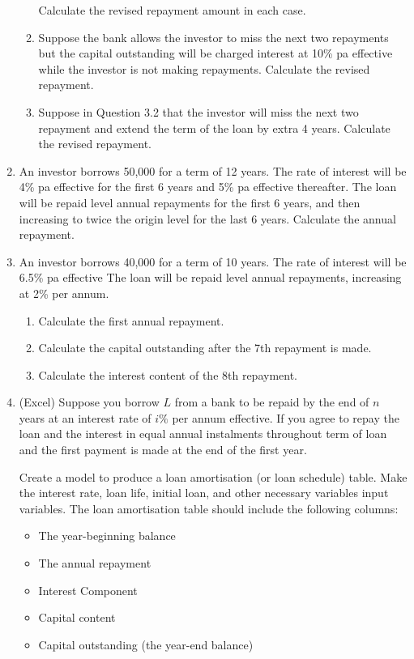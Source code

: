 \documentclass[
]{book}
\theoremstyle{definition}
\theoremstyle{definition}
\theoremstyle{definition}
\theoremstyle{definition}
\theoremstyle{remark}
\begin{document}
\begin{enumerate}
\begin{enumerate}
    Calculate the revised repayment amount in each case.
  \item
    Suppose the bank allows the
    investor to miss the next two repayments but the capital
    outstanding will be charged interest at 10\% pa effective while
    the investor is not making repayments. Calculate the revised
    repayment.
  \item
    Suppose in Question 3.2 that the investor will miss the next two
    repayment and extend the term of the loan by extra 4 years.
    Calculate the revised repayment.
  \end{enumerate}
\item
  An investor borrows 50,000 for a term of 12 years. The rate of
  interest will be 4\% pa effective for the first 6 years and 5\% pa
  effective thereafter. The loan will be repaid level annual
  repayments for the first 6 years, and then increasing to twice the
  origin level for the last 6 years. Calculate the annual repayment.
\item
  An investor borrows 40,000 for a term of 10 years. The rate of
  interest will be 6.5\% pa effective The loan will be repaid level
  annual repayments, increasing at 2\% per annum.

  \begin{enumerate}
  \def\labelenumii{\arabic{enumii}.}
  \item
    Calculate the first annual repayment.
  \item
    Calculate the capital outstanding after the 7th repayment is
    made.
  \item
    Calculate the interest content of the 8th repayment.
  \end{enumerate}
\item
  (Excel) Suppose you borrow \(L\) from a bank to be repaid by the end
  of \(n\) years at an interest rate of \(i\%\) per annum effective. If
  you agree to repay the loan and the interest in equal annual
  instalments throughout term of loan and the first payment is made at
  the end of the first year.

  Create a model to produce a loan amortisation (or loan schedule)
  table. Make the interest rate, loan life, initial loan, and other
  necessary variables input variables. The loan amortisation table
  should include the following columns:

  \begin{itemize}
  \item
    The year-beginning balance
  \item
    The annual repayment
  \item
    Interest Component
  \item
    Capital content
  \item
    Capital outstanding (the year-end balance)
  \end{itemize}
\end{enumerate}
\end{document}
